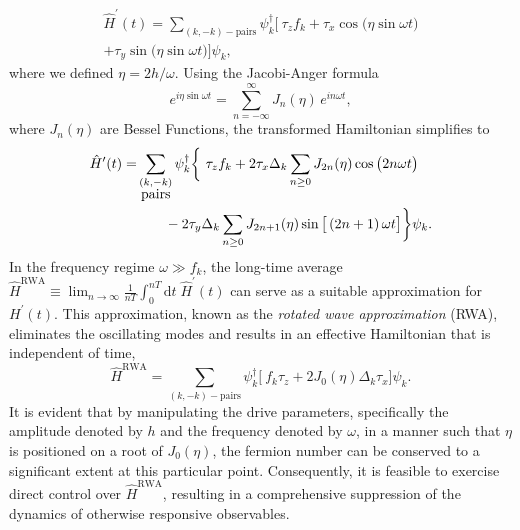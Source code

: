 \documentclass[%
reprint,
superscriptaddress,
amsmath,amssymb,
aps,
prb,
showkeys,
]{revtex4-2}
\begin{document}
\begin{multline}
	\label{eq:rotated:tfim}
	\hat{H}^\prime(t) = \sum_{(k,-k)-\mbox{pairs}} \psi^\dagger_k
	\bigg[\ \tau_z f_k + \tau_x \cos{\big(\eta\sin{\omega t}\big)}  \\
	+ \tau_y \sin{\big(\eta\sin{\omega t}\big)}\bigg]\psi_k,
\end{multline}
where we defined $\eta=2h/\omega$. Using the Jacobi-Anger formula~\cite{arfkenmath}
\begin{equation}
	\label{eq:jacobi}
	e^{i \eta \sin{\omega t}} = \displaystyle\sum_{n=-\infty}^{\infty} J_n(\eta)\, e^{i n \omega t},
\end{equation} 
where $J_n(\eta)$ are Bessel Functions, the transformed Hamiltonian simplifies to \\
\begin{align}
	\hat{H}^\prime(t) =& \sum_{\substack{(k,-k) \\ \mbox{pairs}}} \psi^\dagger_k
	\bigg\{\ \tau_z f_k + 2\tau_x \Delta_k \sum_{n\geq 0} J_{2n}(\eta)\cos{\big(2n\omega t\big)} \nonumber\\
	&\hskip 0.7cm- 2\tau_y\Delta_k \sum_{n\geq 0} J_{2n+1}(\eta)\sin{\big[\left(2n+1\right)\omega t\big]}   \bigg\}\psi_k.
\end{align}
In the frequency regime  $\omega \gg f_k$, the long-time average $\hat{H}^{\mathrm{RWA}}\equiv\displaystyle\lim_{n\rightarrow\infty}\frac{1}{nT}\int^{nT}_0\mathrm{d}t\;\hat{H}^\prime(t)$ can serve as a suitable approximation for $H^\prime(t)$. This approximation, known as the \emph{rotated wave approximation} (RWA), eliminates the oscillating modes and results in an effective Hamiltonian that is independent of time,
\begin{equation}
	\label{eq:hrwa:tfim}
	\hat{H}^{\mathrm{RWA}} = \sum_{(k,-k)-\mbox{pairs}} \psi^\dagger_k
	\bigg[\ f_k\tau_z + 2 J_0(\eta) \Delta_k\tau_x \bigg]\psi_k.
\end{equation}
It is evident that by manipulating the drive parameters, specifically the amplitude denoted by $h$ and the frequency denoted by $\omega$, in a manner such that $\eta$ is positioned on a root of $J_0(\eta)$, the fermion number can be conserved to a significant extent at this particular point. Consequently, it is feasible to exercise direct control over $\hat{H}^{\mathrm{RWA}}$, resulting in a comprehensive suppression of the dynamics of otherwise responsive observables.
\end{document}
